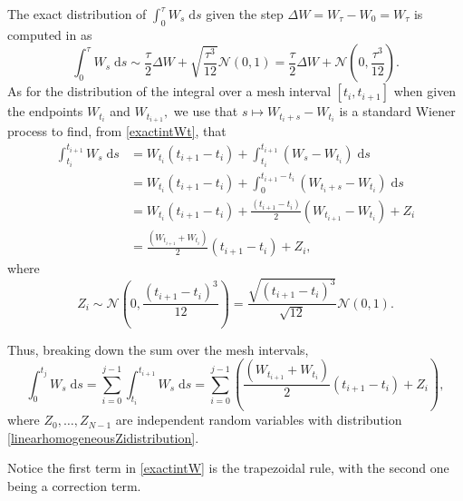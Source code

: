 \documentclass[reqno,12pt]{amsart}
\theoremstyle{plain} %
\theoremstyle{definition} %
\begin{document}
The exact distribution of $\int_0^\tau W_s\;\mathrm{d}s$ given the step $\Delta W = W_\tau - W_0 = W_\tau$ is computed in \cite[Section 14.2]{HanKloeden2017} as
\begin{equation}
    \label{exactintWt}
    \int_0^{\tau} W_s\;\mathrm{d}s \sim \frac{\tau}{2}\Delta W + \sqrt{\frac{\tau^3}{12}}\mathcal{N}(0, 1) = \frac{\tau}{2}\Delta W + \mathcal{N}\left(0, \frac{\tau^3}{12}\right).
\end{equation}
As for the distribution of the integral over a mesh interval $[t_i, t_{i+1}]$ when given the endpoints $W_{t_i}$ and $W_{t_{i+1}},$ we use that $s \mapsto W_{t_i+s} - W_{t_i}$ is a standard Wiener process to find, from \cref{exactintWt}, that
\begin{align*}
    \int_{t_i}^{t_{i+1}} W_s\;\mathrm{d}s & = W_{t_i}(t_{i+1} - t_i) + \int_{t_i}^{t_{i+1}} (W_s - W_{t_i})\;\mathrm{d}s \\
    & = W_{t_i}(t_{i+1} - t_i) + \int_{0}^{t_{i+1} - t_i} (W_{t_i+s} - W_{t_i})\;\mathrm{d}s \\
    & = W_{t_i}(t_{i+1} - t_i) + \frac{(t_{i+1} - t_i)}{2}(W_{t_{i+1}}-W_{t_{i}}) + Z_i \\
    & = \frac{(W_{t_{i+1}}+W_{t_{i}})}{2}(t_{i+1} - t_i) + Z_i,
\end{align*}
where
\begin{equation}
    \label{linearhomogeneousZidistribution}
    Z_i \sim \mathcal{N}\left(0, \frac{(t_{i+1}- t_i)^3}{12}\right) = \frac{\sqrt{(t_{i+1} - t_i)^3}}{\sqrt{12}}\mathcal{N}(0, 1).
\end{equation}

Thus, breaking down the sum over the mesh intervals,
\begin{equation}
    \label{exactintW}
    \int_0^{t_j} W_s\;\mathrm{d}s = \sum_{i = 0}^{j-1} \int_{t_i}^{t_{i+1}} W_s\;\mathrm{d}s = \sum_{i=0}^{j-1} \left( \frac{(W_{t_{i+1}}+W_{t_{i}})}{2}(t_{i+1} - t_i) + Z_i\right),
\end{equation}
where $Z_0, \ldots, Z_{N-1}$ are independent random variables with distribution \cref{linearhomogeneousZidistribution}.

Notice the first term in \cref{exactintW} is the trapezoidal rule, with the second one being a correction term.
\end{document}
